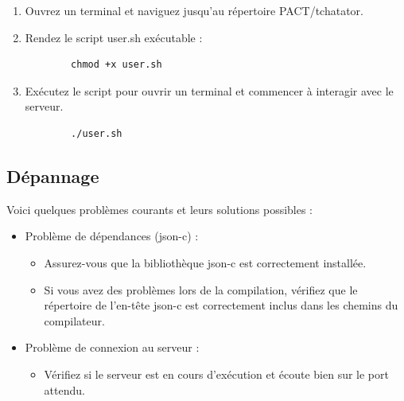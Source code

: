 \documentclass{report}
\begin{document}
\begin{enumerate}
	\item Ouvrez un terminal et naviguez jusqu'au répertoire PACT/tchatator.
	
	\item Rendez le script user.sh exécutable :
	\begin{verbatim}
		chmod +x user.sh
	\end{verbatim}
	
	\item Exécutez le script pour ouvrir un terminal et commencer à interagir avec le serveur.
	
	\begin{verbatim}
		./user.sh
	\end{verbatim}
\end{enumerate}

\subsection{Dépannage}

Voici quelques problèmes courants et leurs solutions possibles :

\begin{itemize}
	\item Problème de dépendances (json-c) :
	\begin{itemize}
		\item Assurez-vous que la bibliothèque json-c est correctement installée.
		\item Si vous avez des problèmes lors de la compilation, vérifiez que le répertoire de l'en-tête json-c est correctement inclus dans les chemins du compilateur.
	\end{itemize}
	\item Problème de connexion au serveur :
	\begin{itemize}
		\item Vérifiez si le serveur est en cours d'exécution et écoute bien sur le port attendu.
	\end{itemize}
\end{itemize}
\end{document}
